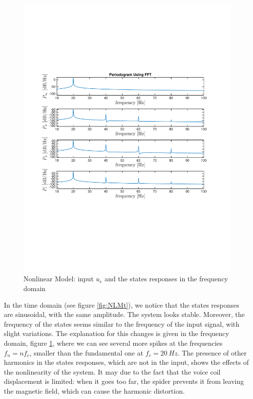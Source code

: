 \begin{figure}[H]
 \centering 
 \includegraphics[trim=2cm 7cm 2cm 7cm, clip=true, totalheight=0.35\textheight, angle=0]{figures/P3frequencyDomain.pdf}
 \caption{Nonlinear Model: input $u_e$ and the states responses in the frequency domain}
 \label{fig:NLMf}
\end{figure}

In the time domain (see figure \ref{fig:NLMt}), we notice that the states responses are sinusoidal, with the same amplitude. The system looks stable. Moreover, the frequency of the states seems similar to the frequency of the input signal, with slight variations. The explanation for this changes is given in the frequency domain, figure \ref{fig:NLMf}, where we can see several more spikes at the frequencies $f_n = nf_c$, smaller than the fundamental one at $f_c = 20 \ Hz$. The presence of other harmonics in the states responses, which are not in the input, shows the effects of the nonlinearity of the system. It may due to the fact that the voice coil displacement is limited: when it goes too far, the spider prevents it from leaving the magnetic field, which can cause the harmonic distortion. 